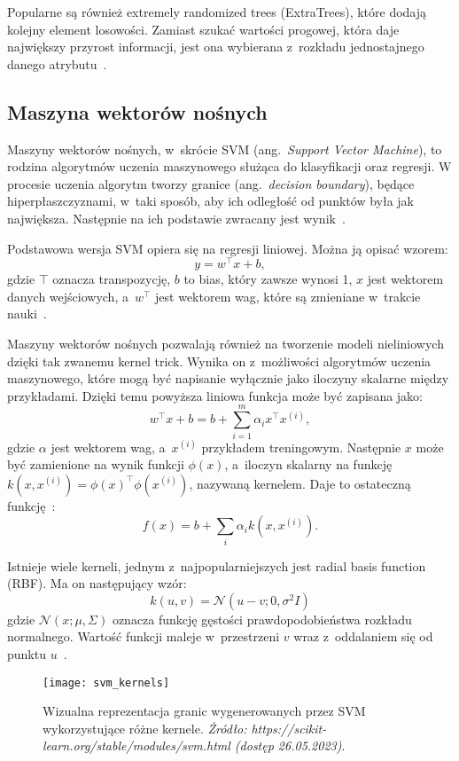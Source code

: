 Popularne są również extremely randomized trees (ExtraTrees), które dodają kolejny element losowości.
Zamiast szukać wartości progowej, która daje największy przyrost informacji, jest ona wybierana z~rozkładu jednostajnego danego atrybutu~\cite{Russell2020}.

\subsection{Maszyna wektorów nośnych}\label{subsec:maszyna-wektorow-nosnych}

Maszyny wektorów nośnych, w~skrócie SVM (ang.~\textit{Support Vector Machine}), to rodzina algorytmów uczenia maszynowego służąca do klasyfikacji oraz regresji.
W procesie uczenia algorytm tworzy granice (ang.~\textit{decision boundary}), będące hiperpłaszczyznami, w~taki sposób, aby ich odległość od punktów była jak największa.
Następnie na ich podstawie zwracany jest wynik~\cite{Russell2020}.

Podstawowa wersja SVM opiera się na regresji liniowej.
Można ją opisać wzorem:
\[y = w^\top x + b,\]
gdzie \(\top\) oznacza transpozycję, \(b\) to bias, który zawsze wynosi 1, \(x\) jest wektorem danych wejściowych, a~\(w^\top\) jest wektorem wag, które są zmieniane w~trakcie nauki~\cite{Goodfellow2016}.

Maszyny wektorów nośnych pozwalają również na tworzenie modeli nieliniowych dzięki tak zwanemu kernel trick.
Wynika on z~możliwości algorytmów uczenia maszynowego, które mogą być napisanie wyłącznie jako iloczyny skalarne między przykładami.
Dzięki temu powyższa liniowa funkcja może być zapisana jako:
\[w^\top x + b = b + \sum_{i=1}^{m} \alpha_{i} x^\top x^{(i)},\]
gdzie \(\alpha\) jest wektorem wag, a~\(x^{(i)}\) przykładem treningowym.
Następnie \(x\) może być zamienione na wynik funkcji \(\phi(x)\), a~iloczyn skalarny na funkcję \(k(x, x^{(i)}) = \phi(x)^\top \phi(x^{(i)})\), nazywaną kernelem.
Daje to ostateczną funkcję~\cite{Goodfellow2016}:
\[f(x) = b + \sum_{i} \alpha_{i} k(x, x^{(i)}).\]

Istnieje wiele kerneli, jednym z~najpopularniejszych jest radial basis function (RBF).
Ma on następujący wzór:
\[k(u, v) = \mathcal{N}(u - v; 0,\sigma^2 I)\]
gdzie \(\mathcal{N}(x; \mu, \Sigma)\) oznacza funkcję gęstości prawdopodobieństwa rozkładu normalnego.
Wartość funkcji maleje w~przestrzeni \(v\) wraz z~oddalaniem się od punktu \(u\)~\cite{Goodfellow2016}.

\begin{figure}[h]
    \centering
    \texttt{[image: svm\_kernels]}
    \caption{Wizualna reprezentacja granic wygenerowanych przez SVM wykorzystujące różne kernele. \textit{Żródło: https://scikit-learn.org/stable/modules/svm.html (dostęp 26.05.2023)}.}
    \label{fig:svm-kernels}
\end{figure}

